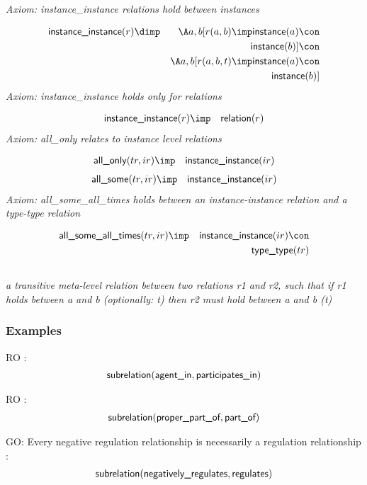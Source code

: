 \emph{Axiom: instance\_instance relations hold between instances}

\begin{eqnarray*}
 \pr{instance\_instance}(r) &\dimp & \A a, b[r(a, b) \imp  \pr{instance}(a) \con \\
&& \pr{instance}(b) ]\con \\
&& \A a, b[r(a, b, t) \imp  \pr{instance}(a) \con \\
&& \pr{instance}(b) ]
\end{eqnarray*}
\emph{Axiom: instance\_instance holds only for relations}

\begin{eqnarray*}
 \pr{instance\_instance}(r) &\imp & \pr{relation}(r) 
\end{eqnarray*}
\emph{Axiom: all\_only relates to instance level relations}

\begin{eqnarray*}
 \pr{all\_only}(tr, ir) &\imp & \pr{instance\_instance}(ir) 
\end{eqnarray*}
\begin{eqnarray*}
 \pr{all\_some}(tr, ir) &\imp & \pr{instance\_instance}(ir) 
\end{eqnarray*}
\emph{Axiom: all\_some\_all\_times holds between an instance-instance relation and a type-type relation}

\begin{eqnarray*}
 \pr{all\_some\_all\_times}(tr, ir) &\imp & \pr{instance\_instance}(ir) \con \\
&& \pr{type\_type}(tr) 
\end{eqnarray*}

\subsection{ }
\emph{a transitive meta-level relation between two relations r1 and r2, such that if r1 holds between a and b (optionally: t) then r2 must hold between a and b (t)}

\subsubsection{Examples}
\begin{clist}
\item RO : \begin{eqnarray*}
 \mbox{\sf subrelation}( \mbox{\sf agent\_in},  \mbox{\sf participates\_in}) 
\end{eqnarray*}

\item RO : \begin{eqnarray*}
 \mbox{\sf subrelation}( \mbox{\sf proper\_part\_of},  \mbox{\sf part\_of}) 
\end{eqnarray*}

\item GO: Every negative regulation relationship is necessarily a regulation relationship : \begin{eqnarray*}
 \mbox{\sf subrelation}( \mbox{\sf negatively\_regulates},  \mbox{\sf regulates}) 
\end{eqnarray*}

\end{clist}

